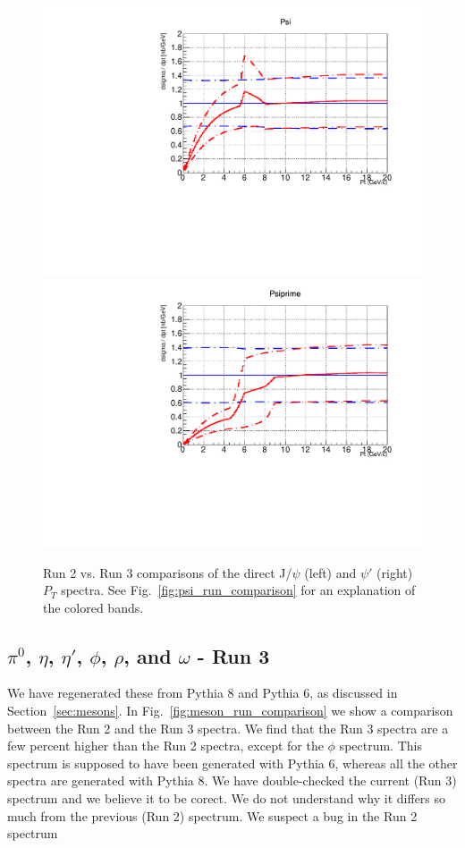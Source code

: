 \documentclass[12pt]{article}
\begin{document}
   \begin{figure}[H]
  \begin{center}
    \includegraphics[width=0.49\linewidth]{../oniaDirect/13p6TeV/jpsi_direct_Run2_Run3_comparison.pdf}
    \includegraphics[width=0.49\linewidth]{../oniaDirect/13p6TeV/psiprime_direct_Run2_Run3_comparison.pdf}   
    \caption{\protect Run 2 vs. Run 3 comparisons of the direct J/$\psi$ (left) and 
      $\psi'$ (right) $P_T$ spectra.  See Fig.~\ref{fig:psi_run_comparison} for an explanation of
    the colored bands.} 
\label{fig:psi_direct_run_comparison}
\end{center}
\end{figure}


\clearpage



\subsection{$\pi^0$, $\eta$, $\eta'$, $\phi$, $\rho$, and $\omega$ -
  Run 3}
\label{sec:mesons3}
We have regenerated these from Pythia 8 and Pythia 6, as discussed in
Section~\ref{sec:mesons}.  In Fig.~\ref{fig:meson_run_comparison} we
show a comparison between the Run 2 and the Run 3 spectra.
We find that the Run 3 spectra are a few percent higher than the Run 2
spectra, except for the $\phi$ spectrum.  This spectrum is supposed
to have been generated with Pythia 6, whereas all the other spectra
are generated with Pythia 8.  We have double-checked the current (Run
3)
spectrum and we believe it to be corect.  We do not understand why
it differs so much from the previous (Run 2) spectrum.  We suspect a
bug
in the Run 2 spectrum
\end{document}
